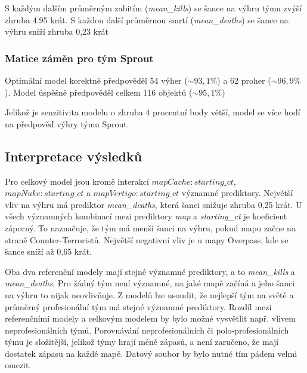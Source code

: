 

S každým dalším průměrným zabitím (\textit{mean\_kills}) se šance na výhru týmu zvýší zhruba 4.95 krát. S každou další průměrnou smrtí (\textit{mean\_deaths})
se šance na výhru sníží zhruba 0,23 krát

\subsubsection{Matice záměn pro tým Sprout}



Optimální model korektně předpověděl 54 výher ($\sim 93,1\%$) a 62 proher ($\sim 96,9\%$). Model úspěšně předpověděl celkem 116 objektů ($\sim 95,1\%$)



Jelikož je senzitivita modelu o zhruba 4 procentní body větší, model se více hodí na předpověď výhry týmu Sprout.

\subsection{Interpretace výsledků}
Pro celkový model jsou kromě interakcí $mapCache:starting\_ct$, $mapNuke:starting\_ct$ a $mapVertigo:starting\_ct$ významné prediktory. Největší vliv na výhru má
prediktor \textit{mean\_deaths}, která šanci snižuje zhruba 0,25 krát. U všech významných kombinací mezi prediktory \textit{map} a \textit{starting\_ct} je koeficient
záporný. To naznačuje, že tým má menší šanci na výhru, pokud mapu začne na straně Counter-Terroristů. Největší negativní vliv je u mapy Overpass, kde se šance
sníží až 0,65 krát.

Oba dva referenční modely mají stejné významné prediktory, a to \textit{mean\_kills} a \textit{mean\_deaths}. Pro žádný tým není významné, na jaké mapě začíná a jeho šanci
na výhru to nijak neovlivňuje. Z modelů lze usoudit, že nejlepší tým na světě a průměrný profesionální tým má stejné významné prediktory. Rozdíl mezi referenčními modely a 
celkovým modelem by bylo možné vysvětlit např. vlivem neprofesionálních týmů. Porovnávání neprofesionálních či polo-profesionálních týmu je složitější, jelikož týmy 
hrají méně zápasů, a není zaručeno, že mají dostatek zápasu na každé mapě. Datový soubor by bylo nutné tím pádem velmi omezit.